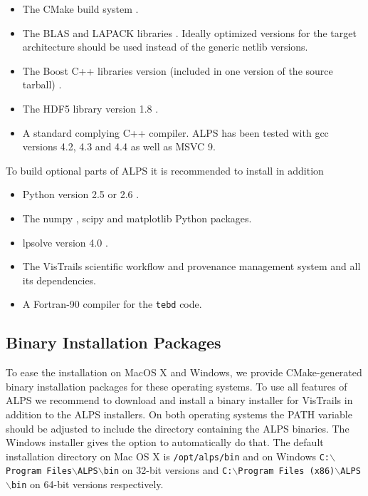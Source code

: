 \documentclass[12pt]{iopart}
\begin{document}
\begin{itemize}
\item The CMake build system \cite{cmake}.
\item The BLAS \cite{blasnetlib} and LAPACK libraries \cite{lapack}. Ideally optimized versions for the target architecture should be used instead of the generic netlib versions.
\item The Boost C++ libraries version (included in one version of the source tarball) \cite{boost}.
\item The HDF5 library version 1.8 \cite{hdf5}.
\item A standard complying C++ compiler. ALPS has been tested with gcc versions 4.2, 4.3 and 4.4 as well as MSVC 9.
\end{itemize}
To build optional parts of ALPS it is recommended to install in addition
\begin{itemize}
\item Python version 2.5 or 2.6 \cite{python}.
\item The numpy \cite{numpy}, scipy \cite{scipy} and matplotlib \cite{matplotlib} Python packages.
\item lpsolve version 4.0 \cite{lpsolve}.
\item The VisTrails scientific workflow and provenance management system \cite{vistrails} and all its dependencies.
\item A Fortran-90 compiler for the {\tt tebd} code.
\end{itemize}

\subsection{Binary Installation Packages}

To ease the installation on MacOS X and Windows, we provide CMake-generated binary installation packages for these operating systems. To use all features of ALPS we recommend to download and install a binary installer for VisTrails \cite{vistrails} in addition to the ALPS installers. On both operating systems the PATH variable should be adjusted to include the directory containing the ALPS binaries. The Windows installer gives the option to automatically do that. The default installation directory on Mac OS X is {\tt /opt/alps/bin} and on Windows {\tt C:$\backslash$Program Files$\backslash$ALPS$\backslash$bin} on 32-bit versions and  {\tt C:$\backslash$Program Files (x86)$\backslash$ALPS$\backslash$bin} on 64-bit versions respectively.
\end{document}
